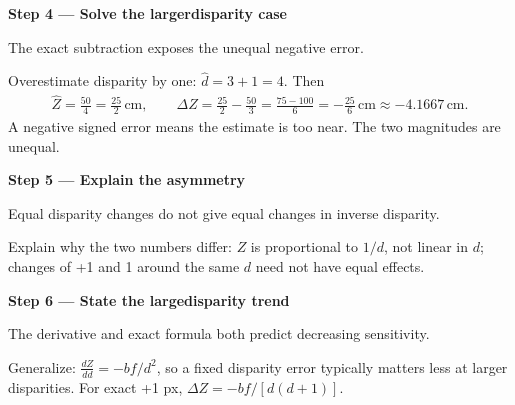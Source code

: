 \documentclass[letterpaper,11pt,english,openany,oneside]{jupyterBook}
\begin{document}
\par

\par\medskip{}
{\color{QuizStepRed}\bfseries Step 4 — Solve the larger\sphinxhyphen{}disparity case}\par\smallskip

\sphinxAtStartPar
{} The exact subtraction exposes the unequal negative error.

\sphinxAtStartPar
Overestimate disparity by one: {\color{QuizMathBlue} \(\widehat d=3+1=4\)}. Then
{\color{QuizMathBlue} \begin{equation*}
\begin{split}
\widehat Z=\frac{50}{4}=\frac{25}{2}\,\mathrm{cm},\qquad
\Delta Z=\frac{25}{2}-\frac{50}{3}=\frac{75-100}{6}=-\frac{25}{6}\,\mathrm{cm}\approx-4.1667\,\mathrm{cm}.
\end{split}
\end{equation*}}
\sphinxAtStartPar
A negative signed error means the estimate is too near. The two magnitudes are unequal.

\par

\par\medskip{}
{\color{QuizStepRed}\bfseries Step 5 — Explain the asymmetry}\par\smallskip

\sphinxAtStartPar
{} Equal disparity changes do not give equal changes in inverse disparity.

\sphinxAtStartPar
Explain why the two numbers differ: {\color{QuizMathBlue} \(Z\)} is proportional to {\color{QuizMathBlue} \(1/d\)}, not linear in {\color{QuizMathBlue} \(d\)}; changes of +1 and \sphinxhyphen{}1 around the same {\color{QuizMathBlue} \(d\)} need not have equal effects.

\par

\par\medskip{}
{\color{QuizStepRed}\bfseries Step 6 — State the large\sphinxhyphen{}disparity trend}\par\smallskip

\sphinxAtStartPar
{} The derivative and exact formula both predict decreasing sensitivity.

\sphinxAtStartPar
Generalize: {\color{QuizMathBlue} \(\frac{dZ}{dd}=-bf/d^2\)}, so a fixed disparity error typically matters less at larger disparities. For exact +1 px, {\color{QuizMathBlue} \(\Delta Z=-bf/[d(d+1)]\)}.
\end{document}
